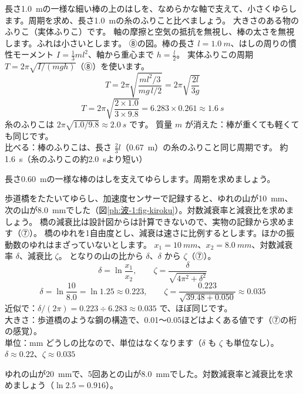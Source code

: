 \label{ph:波-1:ex9}
\begin{phreidai}[棒のふりこ]
長さ\qty{1.0}{m}の一様な細い棒の上のはしを、なめらかな軸で支えて、小さくゆらします。周期を求め、長さ\qty{1.0}{m}の糸のふりこと比べましょう。
\phbamen
大きさのある物のふりこ（実体ふりこ）です。
\phmushi
軸の摩擦と空気の抵抗を無視し、棒の太さを無視します。ふれは小さいとします。
\phzu
⑧の図。棒の長さ $l=\qty{1.0}{m}$、はしの周りの慣性モーメント $I=\tfrac{1}{3}ml^2$、軸から重心まで $h=\tfrac{l}{2}$。
\phriyu
実体ふりこの周期 $T=2\pi\sqrt{I/(mgh)}$（⑧）を使います。
\phtateru
\[T=2\pi\sqrt{\frac{ml^2/3}{mg\,l/2}}=2\pi\sqrt{\frac{2l}{3g}}\]
\phtoku
\[T=2\pi\sqrt{\frac{2\times1.0}{3\times9.8}}=6.283\times0.261\approx\qty{1.6}{s}\]
糸のふりこは $2\pi\sqrt{1.0/9.8}\approx\qty{2.0}{s}$ です。
\phtashikame
質量 $m$ が消えた：棒が重くても軽くても同じです。\\
比べる：棒のふりこは、長さ $\tfrac{2}{3}l$（\qty{0.67}{m}）の糸のふりこと同じ周期です。
\kotae 約\qty{1.6}{s}（糸のふりこの約\qty{2.0}{s}より短い）
\end{phreidai}
\begin{jibun}
長さ\qty{0.60}{m}の一様な棒のはしを支えてゆらします。周期を求めましょう。
\end{jibun}

\label{ph:波-1:ex10}
\begin{phreidai}[ゆれの記録から減衰比を読む]
歩道橋をたたいてゆらし、加速度センサーで記録すると、ゆれの山が\qty{10}{mm}、次の山が\qty{8.0}{mm}でした（図\ref{ph:波-1:fig-kiroku}）。対数減衰率と減衰比を求めましょう。
\phbamen
橋の減衰比は設計図からは計算できないので、実物の記録から求めます（⑦）。
\phmushi
橋のゆれを1自由度とし、減衰は速さに比例するとします。ほかの振動数のゆれはまざっていないとします。
\phzu
$x_1=\qty{10}{mm}$、$x_2=\qty{8.0}{mm}$、対数減衰率 $\delta$、減衰比 $\zeta$。
\phriyu
となりの山の比から $\delta$、$\delta$ から $\zeta$（⑦）。
\phtateru
\[\delta=\ln\frac{x_1}{x_2},\qquad \zeta=\frac{\delta}{\sqrt{4\pi^2+\delta^2}}\]
\phtoku
\[\delta=\ln\frac{10}{8.0}=\ln1.25\approx0.223,\qquad \zeta=\frac{0.223}{\sqrt{39.48+0.050}}\approx0.035\]
\phtashikame
近似で：$\delta/(2\pi)=0.223\div6.283\approx0.035$ で、ほぼ同じです。\\
大きさ：歩道橋のような鋼の構造で、0.01〜0.05ほどはよくある値です（⑦の桁の感覚）。\\
単位：mm どうしの比なので、単位はなくなります（$\delta$ も $\zeta$ も単位なし）。
\kotae $\delta\approx0.22$、$\zeta\approx0.035$
\end{phreidai}
\begin{jibun}
ゆれの山が\qty{20}{mm}で、5回あとの山が\qty{8.0}{mm}でした。対数減衰率と減衰比を求めましょう（$\ln2.5=0.916$）。
\end{jibun}

